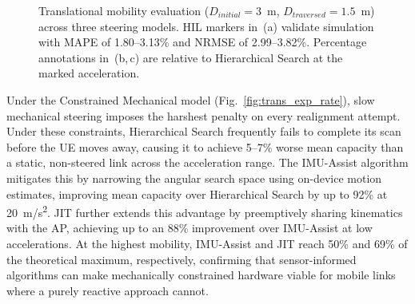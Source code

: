 \documentclass[fleqn,10pt]{wlscirep}
\newcommand{\legline}[2]{%
    \tikz[baseline=-0.5ex]{
        \draw[#1, #2, line width=1.5pt] (0,0) -- (0.5,0);
    }%
}
\newcommand{\legmark}[2]{%
    \tikz[baseline=-0.5ex]{
        \node[#2, fill=#1, draw=#1, inner sep=2pt, scale=0.8] at (0,0) {};
    }%
}
\begin{document}
\begin{figure}[ht!]

    \caption{Translational mobility evaluation ($D_{initial} = 3$~m, $D_{traversed} = 1.5$~m) across three steering models. HIL markers in~(a) validate simulation with MAPE of 1.80--3.13\% and NRMSE of 2.99--3.82\%. Percentage annotations in~(b,\,c) are relative to Hierarchical Search at the marked acceleration.}
    \label{fig:translational_rate}
    \vspace{-5pt}
\end{figure}

Under the Constrained Mechanical model (Fig.~\ref{fig:trans_exp_rate}), slow mechanical steering imposes the harshest penalty on every realignment attempt. Under these constraints, Hierarchical Search frequently fails to complete its scan before the UE moves away, causing it to achieve 5–7\% worse mean capacity than a static, non-steered link across the acceleration range. The IMU-Assist algorithm mitigates this by narrowing the angular search space using on-device motion estimates, improving mean capacity over Hierarchical Search by up to 92\% at \SI{20}{m/s^2}. JIT further extends this advantage by preemptively sharing kinematics with the AP, achieving up to an 88\% improvement over IMU-Assist at low accelerations. At the highest mobility, IMU-Assist and JIT reach 50\% and 69\% of the theoretical maximum, respectively, confirming that sensor-informed algorithms can make mechanically constrained hardware viable for mobile links where a purely reactive approach cannot.
\end{document}
